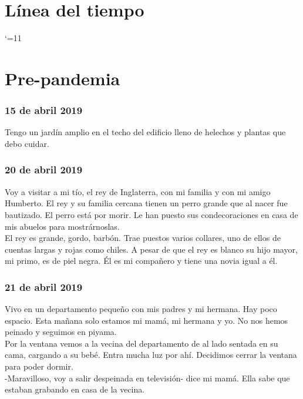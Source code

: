 \documentclass[12pt]{book}
\begin{document}
\chapter{Línea del tiempo}

\catcode `\@=11
\def\chron@selectmonth#1{\ifcase#1\or enero\or febrero\or
marzo\or abril \or mayo \or junio \or julio \or agosto \or
septiembre \or octubre \or noviembre \or diciembre\fi}
\startchronology
[startyear=2019,stopyear=2022]
\stopchronology


\chapter{Pre-pandemia}
\label{prepandemia}
\subsection*{\hfill 15 de abril 2019}

Tengo un jardín amplio en el techo del edificio lleno de helechos y plantas que debo cuidar.

\subsection*{\hfill 20 de abril 2019}

Voy a visitar a mi tío, el rey de Inglaterra, con mi familia y con mi amigo Humberto. El rey y su familia cercana tienen un perro grande que al nacer fue bautizado. El perro está por morir. Le han puesto sus condecoraciones en casa de mis abuelos para mostrárnoslas.
\\
El rey es grande, gordo, barbón. Trae puestos varios collares, uno de ellos de cuentas largas y rojas como chiles. A pesar de que el rey es blanco su hijo mayor, mi primo, es de piel negra. Él es mi compañero y tiene una novia igual a él.

\subsection*{\hfill 21 de abril 2019}

Vivo en un departamento pequeño con mis padres y mi hermana. Hay poco espacio. Esta mañana solo estamos mi mamá, mi hermana y yo. No nos hemos peinado y seguimos en piyama. 
\\
Por la ventana vemos a la vecina del departamento de al lado sentada en su cama, cargando a su bebé. Entra mucha luz por ahí. Decidimos cerrar la ventana para poder dormir.
\\
-Maravilloso, voy a salir despeinada en televisión- dice mi mamá. Ella sabe que estaban grabando en casa de la vecina.
\end{document}
